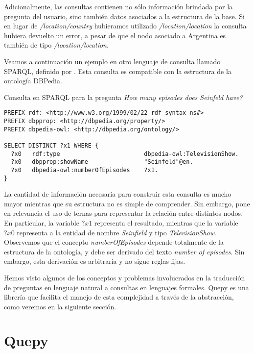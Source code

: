 Adicionalmente, las consultas contienen no sólo información brindada por la pregunta del usuario, sino también datos asociados a la estructura de la base. Si en lugar de \textit{/location/country} hubieramos utilizado \textit{/location/location} la consulta hubiera devuelto un error, a pesar de que el nodo asociado a Argentina es también de tipo \textit{/location/location}.

Veamos a continuación un ejemplo en otro lenguaje de consulta llamado SPARQL, definido por \citet{sparql}. Esta consulta es compatible con la estructura de la ontología DBPedia.

\begin{example} Consulta en SPARQL para la pregunta \textit{How many episodes does Seinfeld have?}
\begin{lstlisting}
PREFIX rdf: <http://www.w3.org/1999/02/22-rdf-syntax-ns#>
PREFIX dbpprop: <http://dbpedia.org/property/>
PREFIX dbpedia-owl: <http://dbpedia.org/ontology/>

SELECT DISTINCT ?x1 WHERE {
  ?x0   rdf:type                        dbpedia-owl:TelevisionShow.
  ?x0   dbpprop:showName                "Seinfeld"@en.
  ?x0   dbpedia-owl:numberOfEpisodes    ?x1.
}
\end{lstlisting}
\end{example}

La cantidad de información necesaria para construir esta consulta es mucho mayor mientras que su estructura no es simple de comprender. Sin embargo, pone en relevancia el uso de ternas para representar la relación entre distintos nodos. En particular, la variable $?x1$ representa el resultado, mientras que la variable $?x0$ representa a la entidad de nombre \textit{Seinfield} y tipo \textit{TelevisionShow}. Observemos que el concepto \textit{numberOfEpisodes} depende totalmente de la estructura de la ontología, y debe ser derivado del texto \textit{number of episodes}. Sin embargo, esta derivación es arbitraria y no sigue reglas fijas.

Hemos visto algunos de los conceptos y problemas involucrados en la traducción de preguntas en lenguaje natural a consultas en lenguajes formales. Quepy es una librería que facilita el manejo de esta complejidad a través de la abstracción, como veremos en la siguiente sección.


\section{Quepy}

